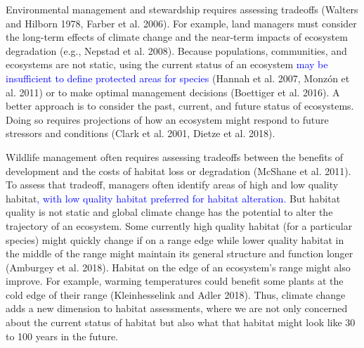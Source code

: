 \documentclass[
  12pt,
]{article}
\begin{document}
Environmental management and stewardship requires assessing tradeoffs (Walters and Hilborn 1978, Farber et al. 2006).
For example, land managers must consider the long-term effects of climate change and the near-term impacts of ecosystem degradation (e.g., Nepstad et al. 2008).
Because populations, communities, and ecosystems are not static, using the current status of an ecosystem \textcolor{blue}{may be insufficient to define protected areas for species} (Hannah et al. 2007, Monzón et al. 2011) or to make optimal management decisions (Boettiger et al. 2016).
A better approach is to consider the past, current, and future status of ecosystems.
Doing so requires projections of how an ecosystem might respond to future stressors and conditions (Clark et al. 2001, Dietze et al. 2018).

Wildlife management often requires assessing tradeoffs between the benefits of development and the costs of habitat loss or degradation (McShane et al. 2011).
To assess that tradeoff, managers often identify areas of high and low quality habitat\textcolor{blue}{, with low quality habitat preferred for habitat alteration.}
But habitat quality is not static and global climate change has the potential to alter the trajectory of an ecosystem.
Some currently high quality habitat (for a particular species) might quickly change if on a range edge while lower quality habitat in the middle of the range might maintain its general structure and function longer (Amburgey et al. 2018).
Habitat on the edge of an ecosystem's range might also improve.
For example, warming temperatures could benefit some plants at the cold edge of their range (Kleinhesselink and Adler 2018).
Thus, climate change adds a new dimension to habitat assessments, where we are not only concerned about the current status of habitat but also what that habitat might look like 30 to 100 years in the future.
\end{document}
